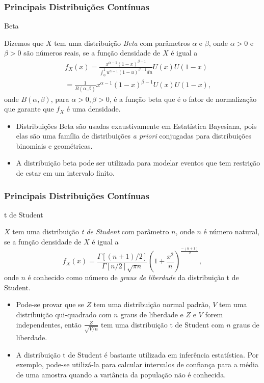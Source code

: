 \begin{frame}
\frametitle{\textbf{Principais Distribuições Contínuas}}
\baselineskip=13pt
\begin{block}{Beta}

Dizemos que $X$ tem uma distribuição {\em Beta} com parâmetros $\alpha$ e $\beta$, onde $\alpha>0$ e $\beta>0$ são números
reais, se a função densidade de $X$ é igual a
%
\begin{eqnarray}
& & f_X(x)= \frac{x^{\alpha-1}(1-x)^{\beta -1}}{\int_{0}^{1}u^{\alpha-1}(1-u)^{\beta -1}du}U(x)U(1-x)\nonumber\\
& & =\frac{1}{B(\alpha,\beta)}x^{\alpha-1}(1-x)^{\beta -1}U(x)U(1-x),
\nonumber
\end{eqnarray}
onde $B(\alpha,\beta)$, para $\alpha>0,\beta>0$, é a função beta que é o fator de normalização que garante que $f_X$ é uma densidade.

\begin{itemize}
\item Distribuições Beta são usadas exaustivamente em Estatística Bayesiana, pois elas são uma família de distribuições {\em a priori} conjugadas para distribuições binomiais e geométricas.

\item A distribuição beta pode ser utilizada para modelar eventos que tem restrição de estar em um intervalo finito.
\end{itemize}

\end{block}
\end{frame}

\begin{frame}
\frametitle{\textbf{Principais Distribuições Contínuas}}
\baselineskip=13pt
\begin{block}{t de Student}

$X$ tem uma distribuição {\em t de Student} com parâmetro $n$, onde $n$ é número
natural, se a função densidade de $X$ é igual a
$$ f_X(x)= \frac{\Gamma[(n+1)/2]}{\Gamma[n/2]\sqrt{\pi n}}(1+\frac{x^2}{n})^{\frac{-(n+1)}{2}},$$
onde $n$ é conhecido como número de {\em graus de liberdade} da distribuição t de Student.

\begin{itemize}
\item Pode-se provar que se $Z$ tem uma distribuição normal padrão, $V$ tem uma distribuição qui-quadrado com $n$ graus de liberdade e $Z$ e $V$ forem independentes, então $\frac{Z}{\sqrt{V/n}}$ tem uma distribuição t de Student com $n$ graus de liberdade.

\item A distribuição t de Student é bastante utilizada em inferência estatística. Por exemplo, pode-se utilizá-la para calcular intervalos de confiança para a média de uma amostra quando a variância da população não é conhecida.
\end{itemize}

\end{block}
\end{frame}

